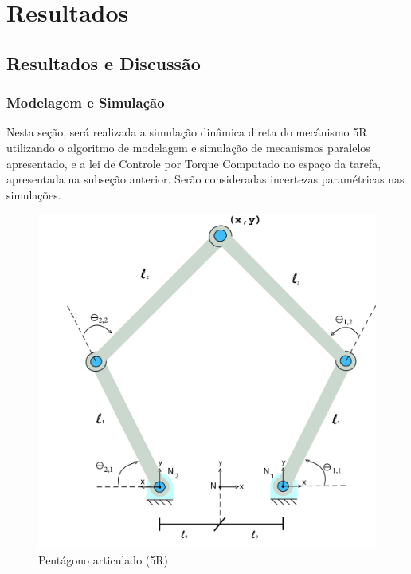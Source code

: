 \documentclass[]{politex}
\begin{document}
\part{Resultados}

\chapter{Resultados e Discussão}


\section{Modelagem e Simulação}

Nesta seção, será realizada a simulação dinâmica direta do mecânismo 5R utilizando o algoritmo de modelagem e simulação de mecanismos paralelos apresentado, e a lei de Controle por Torque Computado no espaço da tarefa, apresentada na subseção anterior. Serão consideradas incertezas paramétricas nas simulações.
\begin{figure}[h]
	\centering
	\includegraphics[scale=0.14]{../figures/5Rscan.jpg}  
	\caption{Pentágono articulado (5R)}
	\label{fig:5R}
\end{figure}
\end{document}
